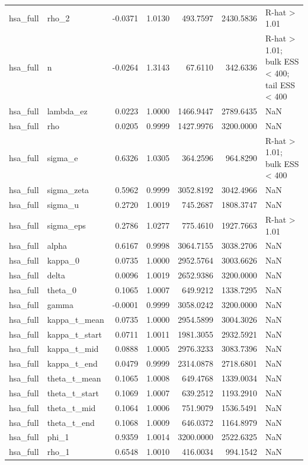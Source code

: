 \begin{tabular}{llrrrrl}
hsa\_full & rho\_2 & -0.0371 & 1.0130 & 493.7597 & 2430.5836 & R-hat > 1.01 \\
hsa\_full & n & -0.0264 & 1.3143 & 67.6110 & 342.6336 & R-hat > 1.01; bulk ESS < 400; tail ESS < 400 \\
hsa\_full & lambda\_ez & 0.0223 & 1.0000 & 1466.9447 & 2789.6435 & NaN \\
hsa\_full & rho & 0.0205 & 0.9999 & 1427.9976 & 3200.0000 & NaN \\
hsa\_full & sigma\_e & 0.6326 & 1.0305 & 364.2596 & 964.8290 & R-hat > 1.01; bulk ESS < 400 \\
hsa\_full & sigma\_zeta & 0.5962 & 0.9999 & 3052.8192 & 3042.4966 & NaN \\
hsa\_full & sigma\_u & 0.2720 & 1.0019 & 745.2687 & 1808.3747 & NaN \\
hsa\_full & sigma\_eps & 0.2786 & 1.0277 & 775.4610 & 1927.7663 & R-hat > 1.01 \\
hsa\_full & alpha & 0.6167 & 0.9998 & 3064.7155 & 3038.2706 & NaN \\
hsa\_full & kappa\_0 & 0.0735 & 1.0000 & 2952.5764 & 3003.6626 & NaN \\
hsa\_full & delta & 0.0096 & 1.0019 & 2652.9386 & 3200.0000 & NaN \\
hsa\_full & theta\_0 & 0.1065 & 1.0007 & 649.9212 & 1338.7295 & NaN \\
hsa\_full & gamma & -0.0001 & 0.9999 & 3058.0242 & 3200.0000 & NaN \\
hsa\_full & kappa\_t\_mean & 0.0735 & 1.0000 & 2954.5899 & 3004.3026 & NaN \\
hsa\_full & kappa\_t\_start & 0.0711 & 1.0011 & 1981.3055 & 2932.5921 & NaN \\
hsa\_full & kappa\_t\_mid & 0.0888 & 1.0005 & 2976.3233 & 3083.7396 & NaN \\
hsa\_full & kappa\_t\_end & 0.0479 & 0.9999 & 2314.0878 & 2718.6801 & NaN \\
hsa\_full & theta\_t\_mean & 0.1065 & 1.0008 & 649.4768 & 1339.0034 & NaN \\
hsa\_full & theta\_t\_start & 0.1069 & 1.0007 & 639.2512 & 1193.2910 & NaN \\
hsa\_full & theta\_t\_mid & 0.1064 & 1.0006 & 751.9079 & 1536.5491 & NaN \\
hsa\_full & theta\_t\_end & 0.1068 & 1.0009 & 646.0372 & 1164.8979 & NaN \\
hsa\_full & phi\_1 & 0.9359 & 1.0014 & 3200.0000 & 2522.6325 & NaN \\
hsa\_full & rho\_1 & 0.6548 & 1.0010 & 416.0034 & 994.1542 & NaN \\

\end{tabular}
